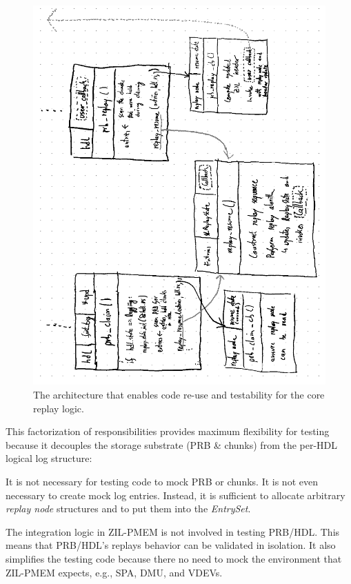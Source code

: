 \documentclass[12pt,a4paper,twoside]{book}
\begin{document}
{\begin{figure}[H]
    \centering
    \includegraphics{fig/prb_replay_resume_architecture}
    \caption{The architecture that enables code re-use and testability for the core replay logic.}
    \label{fig:eval:prb_replay_resume_architecture}
\end{figure}

This factorization of responsibilities provides maximum flexibility for testing because it decouples the storage substrate (PRB \& chunks) from the per-HDL logical log structure:
\begin{description}[noitemsep,leftmargin=1.5cm,labelindent=1cm]
    \item[Independence of PRB \& Chunks]
        It is not necessary for testing code to mock PRB or chunks.
        It is not even necessary to create mock log entries.
        Instead, it is sufficient to allocate arbitrary \textit{replay node} structures and to put them into the \textit{EntrySet}.

    \item[Independence of ZIL-PMEM]
        The integration logic in ZIL-PMEM is not involved in testing PRB/HDL.
        This means that PRB/HDL's replays behavior can be validated in isolation.
        It also simplifies the testing code because there no need to mock the environment that ZIL-PMEM expects, e.g., SPA, DMU, and VDEVs.


\end{description}}
\end{document}

